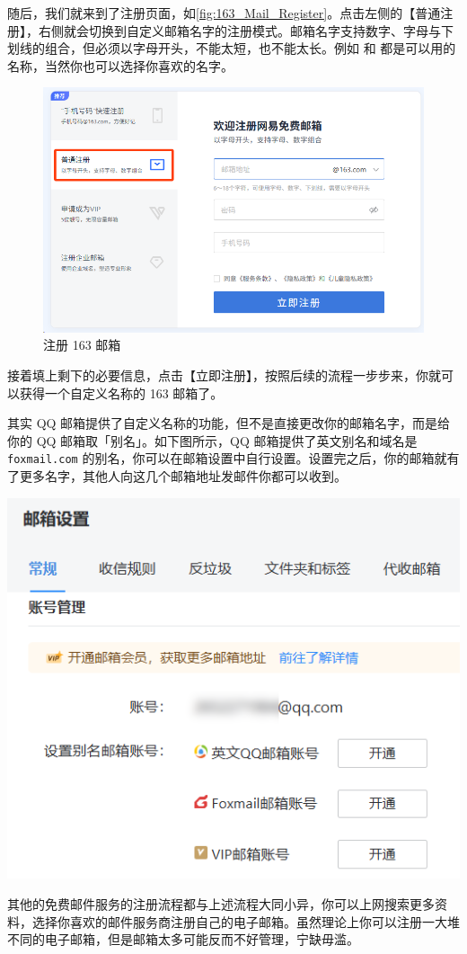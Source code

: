 随后，我们就来到了注册页面，如\autoref{fig:163_Mail_Register}。点击左侧的【普通注册】，右侧就会切换到自定义邮箱名字的注册模式。邮箱名字支持数字、字母与下划线的组合，但必须以字母开头，不能太短，也不能太长。例如  和  都是可以用的名称，当然你也可以选择你喜欢的名字。

\begin{figure}[htb!]
  \centering
  \includegraphics[width=.6\textwidth]{assets/software/163_Mail_Register.png}
  \caption{注册 163 邮箱}
  \label{fig:163_Mail_Register}
\end{figure}

接着填上剩下的必要信息，点击【立即注册】，按照后续的流程一步步来，你就可以获得一个自定义名称的 163 邮箱了。

\begin{note}
  其实 QQ 邮箱提供了自定义名称的功能，但不是直接更改你的邮箱名字，而是给你的 QQ 邮箱取「别名」。如下图所示，QQ 邮箱提供了英文别名和域名是 \texttt{foxmail.com} 的别名，你可以在邮箱设置中自行设置。设置完之后，你的邮箱就有了更多名字，其他人向这几个邮箱地址发邮件你都可以收到。
  \begin{center}
    \includegraphics[width=.5\textwidth]{assets/software/QQ_Mail_Alias.png}
    \label{fig:QQ_Mail_Alias}
  \end{center}
\end{note}

其他的免费邮件服务的注册流程都与上述流程大同小异，你可以上网搜索更多资料，选择你喜欢的邮件服务商注册自己的电子邮箱。虽然理论上你可以注册一大堆不同的电子邮箱，但是邮箱太多可能反而不好管理，宁缺毋滥。

